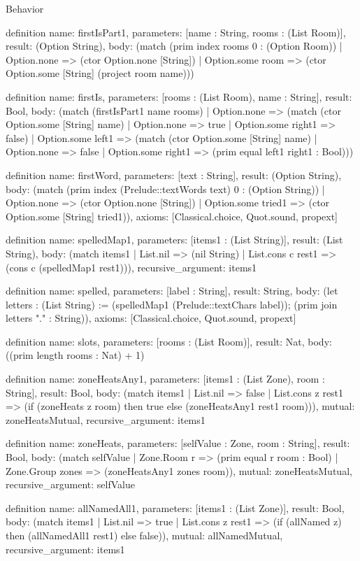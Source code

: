 \begin{lexlean}{Behavior}
\begin{semanticmodule}
definition{
  name: firstIsPart1,
  parameters: [name : String, rooms : (List Room)],
  result: (Option String),
  body: (match (prim index rooms 0 : (Option Room))
    | Option.none => (ctor Option.none [String])
    | Option.some room => (ctor Option.some [String] (project room name)))
}

definition{
  name: firstIs,
  parameters: [rooms : (List Room), name : String],
  result: Bool,
  body: (match (firstIsPart1 name rooms)
    | Option.none => (match (ctor Option.some [String] name)
      | Option.none => true
      | Option.some right1 => false)
    | Option.some left1 => (match (ctor Option.some [String] name)
      | Option.none => false
      | Option.some right1 => (prim equal left1 right1 : Bool)))
}

definition{
  name: firstWord,
  parameters: [text : String],
  result: (Option String),
  body: (match (prim index (Prelude::textWords text) 0 : (Option String))
    | Option.none => (ctor Option.none [String])
    | Option.some tried1 => (ctor Option.some [String] tried1)),
  axioms: [Classical.choice, Quot.sound, propext]
}

definition{
  name: spelledMap1,
  parameters: [items1 : (List String)],
  result: (List String),
  body: (match items1
    | List.nil => (nil String)
    | List.cons c rest1 => (cons c (spelledMap1 rest1))),
  recursive_argument: items1
}

definition{
  name: spelled,
  parameters: [label : String],
  result: String,
  body: (let letters : (List String) := (spelledMap1 (Prelude::textChars label)); (prim join letters "." : String)),
  axioms: [Classical.choice, Quot.sound, propext]
}

definition{
  name: slots,
  parameters: [rooms : (List Room)],
  result: Nat,
  body: ((prim length rooms : Nat) + 1)
}

definition{
  name: zoneHeatsAny1,
  parameters: [items1 : (List Zone), room : String],
  result: Bool,
  body: (match items1
    | List.nil => false
    | List.cons z rest1 => (if (zoneHeats z room) then true else (zoneHeatsAny1 rest1 room))),
  mutual: zoneHeatsMutual,
  recursive_argument: items1
}

definition{
  name: zoneHeats,
  parameters: [selfValue : Zone, room : String],
  result: Bool,
  body: (match selfValue
    | Zone.Room r => (prim equal r room : Bool)
    | Zone.Group zones => (zoneHeatsAny1 zones room)),
  mutual: zoneHeatsMutual,
  recursive_argument: selfValue
}

definition{
  name: allNamedAll1,
  parameters: [items1 : (List Zone)],
  result: Bool,
  body: (match items1
    | List.nil => true
    | List.cons z rest1 => (if (allNamed z) then (allNamedAll1 rest1) else false)),
  mutual: allNamedMutual,
  recursive_argument: items1
}


\end{semanticmodule}
\end{lexlean}
